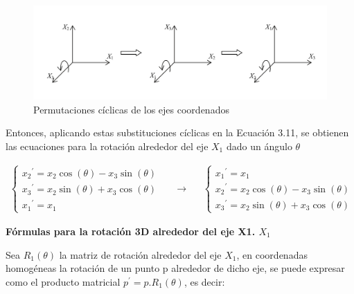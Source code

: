 \begin{figure}[h]
\includegraphics[width=12cm]{Img/GEO/geo-trans.jpg}
\centering
    \caption{\footnotesize{Permutaciones cíclicas de los ejes coordenados}}
\end{figure}

Entonces, aplicando estas substituciones cíclicas en la Ecuación 3.11, se obtienen las ecuaciones para la rotación alrededor del eje $X_{1}$ dado un ángulo
$\theta$


\begin{eqfloat}
\begin{equation*}
  \begin{split}
   \begin{cases}
{x_{2}}^{\prime} = x_{2} \cos(\theta) -x_{3} \sin(\theta) \\ 
{x_{3}}^{\prime} = x_{2} \sin(\theta) +x_{3} \cos(\theta) \\
{x_{1}}^{\prime} = x_{1}
\end{cases}
  \end{split}
\quad\longrightarrow\quad
  \begin{split}
   \begin{cases}
{x_{1}}^{\prime} = x_{1} \\ 
{x_{2}}^{\prime} = x_{2} \cos(\theta) -x_{3} \sin(\theta) \\
{x_{3}}^{\prime} = x_{2} \sin(\theta) +x_{3} \cos(\theta)
\end{cases}
\end{split}
\end{equation*}
\end{eqfloat}

\begin{center}
\textbf{\footnotesize{Fórmulas para la rotación 3D alrededor del eje X1. $X_{1}$}}
\end{center}
    
Sea $R_{1}( \theta )$ la matriz de rotación alrededor del eje $X_{1}$, en coordenadas homogéneas la
rotación de un punto p alrededor de dicho eje, se puede expresar como el producto matricial $p^{\prime} = p.R_{1}(\theta)$, es decir:

